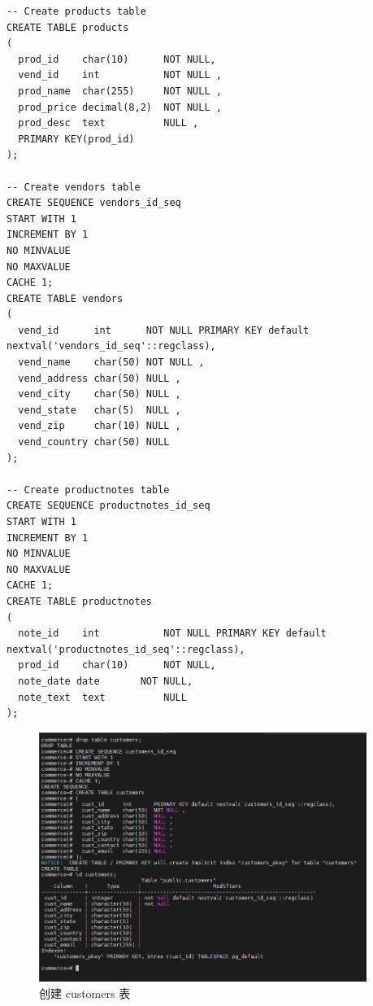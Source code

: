 \begin{enumerate}
\begin{center}
\begin{verbatim}
-- Create products table
CREATE TABLE products
(
  prod_id    char(10)      NOT NULL,
  vend_id    int           NOT NULL ,
  prod_name  char(255)     NOT NULL ,
  prod_price decimal(8,2)  NOT NULL ,
  prod_desc  text          NULL ,
  PRIMARY KEY(prod_id)
);

-- Create vendors table
CREATE SEQUENCE vendors_id_seq
START WITH 1
INCREMENT BY 1
NO MINVALUE
NO MAXVALUE
CACHE 1;
CREATE TABLE vendors
(
  vend_id      int      NOT NULL PRIMARY KEY default nextval('vendors_id_seq'::regclass),
  vend_name    char(50) NOT NULL ,
  vend_address char(50) NULL ,
  vend_city    char(50) NULL ,
  vend_state   char(5)  NULL ,
  vend_zip     char(10) NULL ,
  vend_country char(50) NULL
);

-- Create productnotes table
CREATE SEQUENCE productnotes_id_seq
START WITH 1
INCREMENT BY 1
NO MINVALUE
NO MAXVALUE
CACHE 1;
CREATE TABLE productnotes
(
  note_id    int           NOT NULL PRIMARY KEY default nextval('productnotes_id_seq'::regclass),
  prod_id    char(10)      NOT NULL,
  note_date date       NOT NULL,
  note_text  text          NULL
);
\end{verbatim}
\end{center}
\begin{figure}[H]
  \begin{center}
    \includegraphics[width=0.95\textwidth,scale=0.5]{./figures/create_table_customers.png}
  \end{center}
  \caption{创建 customers 表}
\end{figure}
\begin{figure}[H]
  \begin{center}

\end{center}
\end{figure}
\end{enumerate}
